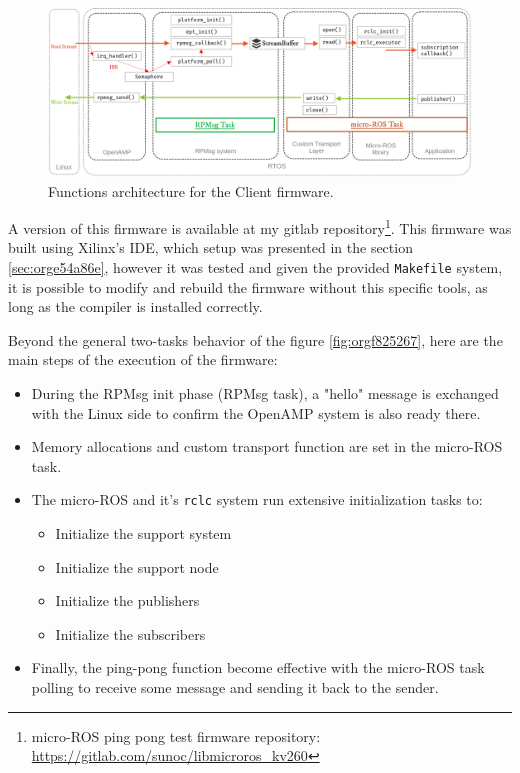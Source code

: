 \documentclass[10pt]{article}
\begin{document}
\begin{figure}[htbp]
\centering
\includegraphics[width=.9\textwidth]{./img/client_arch.png}
\caption{\label{fig:orge3d0e5e}Functions architecture for the Client firmware.}
\end{figure}

A version of this firmware is available at my gitlab repository\footnote{micro-ROS ping pong test firmware repository: \url{https://gitlab.com/sunoc/libmicroros\_kv260}}. This firmware was built using
Xilinx's IDE, which setup was presented in the section \ref{sec:orge54a86e}, however it was tested
and given the provided \texttt{Makefile} system, it is possible to modify and rebuild the firmware
without this specific tools, as long as the compiler is installed correctly.

Beyond the general two-tasks behavior of the figure \ref{fig:orgf825267}, here are the main steps
of the execution of the firmware:
\begin{itemize}
\item During the RPMsg init phase (RPMsg task), a "hello" message is exchanged with the Linux side
to confirm the OpenAMP system is also ready there.
\item Memory allocations and custom transport function are set in the micro-ROS task.
\item The micro-ROS and it's \texttt{rclc} system run extensive initialization tasks to:
\begin{itemize}
\item Initialize the support system
\item Initialize the support node
\item Initialize the publishers
\item Initialize the subscribers
\end{itemize}
\item Finally, the ping-pong function become effective with the micro-ROS task
polling to receive some message and sending it back to the sender.
\end{itemize}
\end{document}
